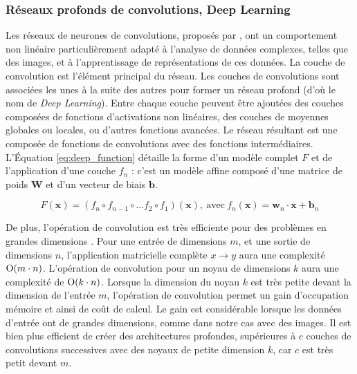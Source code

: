 \subsubsection{Réseaux profonds de convolutions, Deep Learning} \label{subsubsec:deep_learning}
Les réseaux de neurones de convolutions, proposés par \cite{lecun_backpropagation_1989}, ont un comportement non linéaire particulièrement adapté à l'analyse de données complexes, telles que des images, et à l'apprentissage de représentations de ces données.
La couche de convolution est l'élément principal du réseau.
Les couches de convolutions sont associées les unes à la suite des autres pour former un réseau profond (d'où le nom de \textit{Deep Learning}).
Entre chaque couche peuvent être ajoutées des couches composées de fonctions d'activations non linéaires, des couches de moyennes globales ou locales, ou d'autres fonctions avancées.
Le réseau résultant est une composée de fonctions de convolutions avec des fonctions intermédiaires.
L'Équation \ref{eq:deep_function} détaille la forme d'un modèle complet $F$ et de l'application d'une couche $f_n$ : c'est un modèle affine composé d'une matrice de poids $\mathbf{W}$ et d'un vecteur de biais $\mathbf{b}$.

\begin{equation} \label{eq:deep_function}
F(\mathbf{x}) = \left(f_{n} \circ f_{n-1} \circ \ldots f_{2} \circ f_{1}\right)(\mathbf{x}), \ \text{avec} \ f_n(\mathbf{x}) = \mathbf{w}_n \cdot \mathbf{x} + \mathbf{b}_n
\end{equation}

De plus, l'opération de convolution est très efficiente pour des problèmes en grandes dimensions \cite{goodfellow_deep_2016}.
Pour une entrée de dimensions $m$, et une sortie de dimensions $n$, l'application matricielle complète $x \rightarrow y$ aura une complexité $\operatorname{O}(m \cdot n)$.
L'opération de convolution pour un noyau de dimensions $k$ aura une complexité de $\operatorname{O}(k \cdot n)$.
Lorsque la dimension du noyau $k$ est très petite devant la dimension de l'entrée $m$, l'opération de convolution permet un gain d'occupation mémoire et ainsi de coût de calcul.
Le gain est considérable lorsque les données d'entrée ont de grandes dimensions, comme dans notre cas avec des images.
Il est bien plus efficient de créer des architectures profondes, supérieures à $c$ couches de convolutions successives avec des noyaux de petite dimension $k$, car $c$ est très petit devant $m$.


